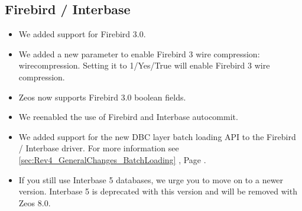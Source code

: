 \documentclass[a4paper,12pt,oneside]{book}
\begin{document}
\subsection{Firebird / Interbase}
\label{sec:Rev4_DriverSpecificChanges_FirebirdInterbase}
\begin{itemize}
\item We added support for Firebird 3.0.
\item 
  We added a new parameter to enable Firebird 3 wire compression: wirecompression.
	Setting it to 1/Yes/True will enable Firebird 3 wire compression.
\item 
  Zeos now supports Firebird 3.0 boolean fields.
\item
  We reenabled the use of Firebird and Interbase autocommit.
\item
  We added support for the new DBC layer batch loading API to the Firebird / Interbase driver.
	For more information see \ref{sec:Rev4_GeneralChanges_BatchLoading} , Page \pageref{sec:Rev4_GeneralChanges_BatchLoading}.
\item 
  If you still use Interbase 5 databases, we urge you to move on to a newer version.
	Interbase 5 is deprecated with this version and will be removed with Zeos 8.0.	
\end{itemize}
\end{document}
